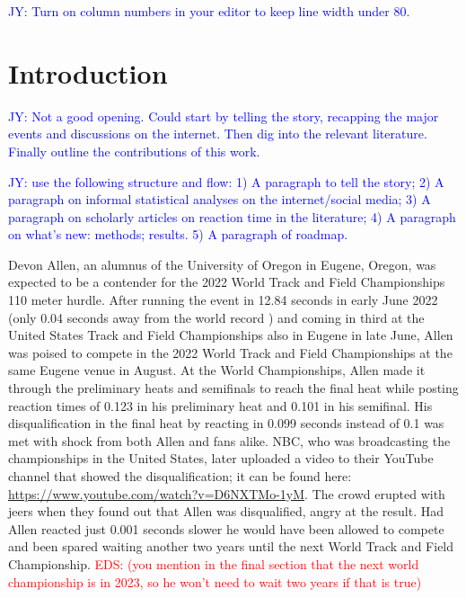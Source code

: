 \documentclass[12pt, letterpaper, titlepage]{article}
\newcommand{\jy}[1]{\textcolor{blue}{JY: #1}}
\newcommand{\eds}[1]{\textcolor{red}{EDS: (#1)}}
\newcommand{\of}[1]{\textcolor{violet}{OF: #1}}
\begin{document}
\jy{Turn on column numbers in your editor to keep line width under 80.}

\section{Introduction}
\label{sec:intro}


\jy{Not a good opening. Could start by telling the story, recapping the major
  events and discussions on the internet. Then dig into the relevant
  literature. Finally outline the contributions of this work.
}


\jy{use the following structure and flow:
  1) A paragraph to tell the story;
  2) A paragraph on informal statistical analyses on the internet/social media;
  3) A paragraph on scholarly articles on reaction time in the literature;
  4) A paragraph on what's new: methods; results.
  5) A paragraph of roadmap.}


Devon Allen, an alumnus of the University of Oregon in 
Eugene, Oregon, was
expected to be a contender for the 2022 World Track and Field Championships 110 
meter hurdle.  After running the event in 12.84 seconds in early June 2022 
(only 0.04 seconds away from the world record \citep{wa2022preview}) and coming 
in third at the United States Track and Field 
Championships also in Eugene in late June, Allen was poised to compete in the 
2022 World Track and Field Championships at the same Eugene venue in August.
At the World Championships, Allen made it through the preliminary
heats and semifinals to reach the final heat while posting reaction times of 
0.123 in his preliminary heat and 0.101 in his semifinal.  
His disqualification in the final heat by reacting in 0.099 seconds instead of 
0.1 was met
with shock from both Allen and fans alike.  NBC, who was broadcasting the
championships in the United States, later uploaded a video to their YouTube
channel that showed the disqualification; it can be found here:
\url{https://www.youtube.com/watch?v=D6NXTMo-1yM}. The crowd erupted with jeers 
when they found out that Allen was disqualified, angry at the result.  Had Allen 
reacted just 0.001 seconds slower he would have been allowed to compete and been 
spared waiting another two years until the next World Track and Field Championship.
\eds{you mention in the final section that the next world championship is in 
2023, so he won't need to wait two years if that is true}
\end{document}
